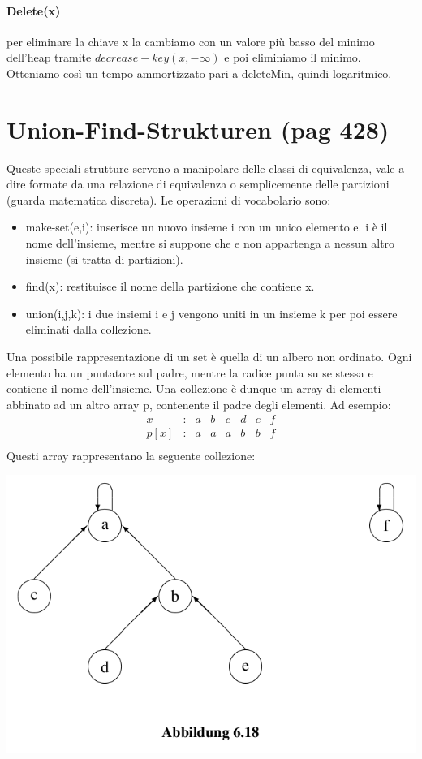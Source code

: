 \documentclass[a4paper]{book}
\begin{document}
\paragraph*{Delete(x)} per eliminare la chiave x la cambiamo con un valore più basso del minimo dell'heap tramite $decrease-key(x,-\infty)$ e poi eliminiamo il minimo. Otteniamo così un tempo ammortizzato pari a deleteMin, quindi logaritmico.
\section{Union-Find-Strukturen (pag 428)}
Queste speciali strutture servono a manipolare delle classi di equivalenza, vale a dire formate da una relazione di equivalenza o semplicemente delle partizioni (guarda matematica discreta). Le operazioni di vocabolario sono:
\begin{itemize}
\item make-set(e,i): inserisce un nuovo insieme i con un unico elemento e. i è il nome dell'insieme, mentre si suppone che e non appartenga a nessun altro insieme (si tratta di partizioni).
\item find(x): restituisce il nome della partizione che contiene x.
\item union(i,j,k): i due insiemi i e j vengono uniti in un insieme k per poi essere eliminati dalla collezione.
\end{itemize}
Una possibile rappresentazione di un set è quella di un albero non ordinato. Ogni elemento ha un puntatore sul padre, mentre la radice punta su se stessa e contiene il nome dell'insieme. Una collezione è dunque un array di elementi abbinato ad un altro array p, contenente il padre degli elementi. Ad esempio:
\[\begin{array}{*{20}{c}}
{x}&{:}&a&{b}&{c}&d&e&f\\
{p[x]}&{:}&{a}&{a}&{a}&{b}&b&f\\
\end{array}\]
Questi array rappresentano la seguente collezione:
\begin{center}
\includegraphics[scale=0.4]{Figures/ufs.png}
\end{center}
\end{document}

